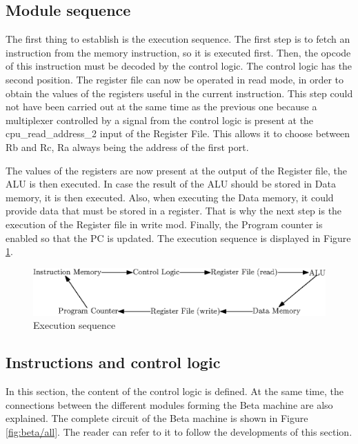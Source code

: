 \subsection{Module sequence}

The first thing to establish is the execution sequence.  The first step is to fetch an instruction 
from the memory instruction, so it is executed first. Then, the opcode of this instruction must be 
decoded by the control logic. The control logic has the second position. The register file can now 
be operated in read mode, in order to obtain the values of the registers useful in the current 
instruction. This step could not have been carried out at the same time as the previous one because 
a multiplexer controlled by a signal from the control logic is present at the cpu\_read\_address\_2 
input of the Register File. This allows it to choose between Rb and Rc, Ra always being the address 
of the first port. 

The values of the registers are now present at the output of the Register file, the ALU is then 
executed. In case the result of the ALU should be stored in Data memory, it is then executed. Also, when 
executing the Data memory, it could provide data that must be stored in a register. That is why the 
next step is the execution of the Register file in write mod. Finally, the Program counter is enabled 
so that the PC is updated. The execution sequence is displayed in Figure \ref{fig:beta/sequence}.

\begin{figure}[H]
    \centering
    \includegraphics[scale=0.8]{Chapter3-CPU/res/sequence}
    \caption{Execution sequence}
    \label{fig:beta/sequence}
\end{figure}

\subsection{Instructions and control logic}

In this section, the content of the control logic is defined. At the same time, the connections 
between the different modules forming the Beta machine are also explained. The complete circuit of 
the Beta machine is shown in Figure \ref{fig:beta/all}. The reader can refer to it to follow the 
developments of this section.


